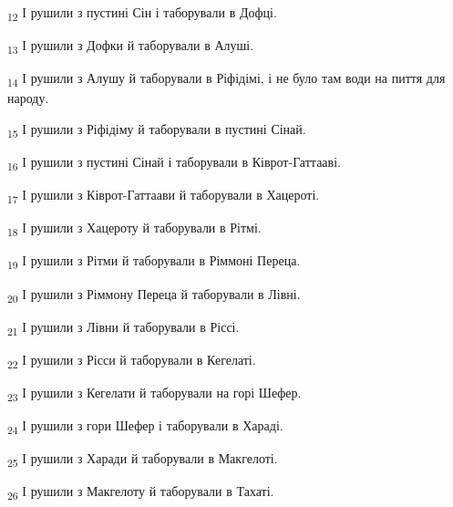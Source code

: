 \begin{tcolorbox}
\textsubscript{12} І рушили з пустині Сін і таборували в Дофці.
\end{tcolorbox}
\begin{tcolorbox}
\textsubscript{13} І рушили з Дофки й таборували в Алуші.
\end{tcolorbox}
\begin{tcolorbox}
\textsubscript{14} І рушили з Алушу й таборували в Ріфідімі, і не було там води на пиття для народу.
\end{tcolorbox}
\begin{tcolorbox}
\textsubscript{15} І рушили з Ріфідіму й таборували в пустині Сінай.
\end{tcolorbox}
\begin{tcolorbox}
\textsubscript{16} І рушили з пустині Сінай і таборували в Ківрот-Гаттааві.
\end{tcolorbox}
\begin{tcolorbox}
\textsubscript{17} І рушили з Ківрот-Гаттаави й таборували в Хацероті.
\end{tcolorbox}
\begin{tcolorbox}
\textsubscript{18} І рушили з Хацероту й таборували в Рітмі.
\end{tcolorbox}
\begin{tcolorbox}
\textsubscript{19} І рушили з Рітми й таборували в Ріммоні Переца.
\end{tcolorbox}
\begin{tcolorbox}
\textsubscript{20} І рушили з Ріммону Переца й таборували в Лівні.
\end{tcolorbox}
\begin{tcolorbox}
\textsubscript{21} І рушили з Лівни й таборували в Ріссі.
\end{tcolorbox}
\begin{tcolorbox}
\textsubscript{22} І рушили з Рісси й таборували в Кегелаті.
\end{tcolorbox}
\begin{tcolorbox}
\textsubscript{23} І рушили з Кегелати й таборували на горі Шефер.
\end{tcolorbox}
\begin{tcolorbox}
\textsubscript{24} І рушили з гори Шефер і таборували в Хараді.
\end{tcolorbox}
\begin{tcolorbox}
\textsubscript{25} І рушили з Харади й таборували в Макгелоті.
\end{tcolorbox}
\begin{tcolorbox}
\textsubscript{26} І рушили з Макгелоту й таборували в Тахаті.
\end{tcolorbox}
